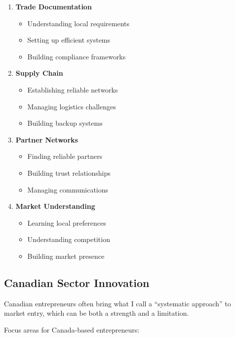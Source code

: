 \begin{enumerate}
    \item \textbf{Trade Documentation}
    \begin{itemize}
        \item Understanding local requirements
        \item Setting up efficient systems
        \item Building compliance frameworks
    \end{itemize}

    \item \textbf{Supply Chain}
    \begin{itemize}
        \item Establishing reliable networks
        \item Managing logistics challenges
        \item Building backup systems
    \end{itemize}

    \item \textbf{Partner Networks}
    \begin{itemize}
        \item Finding reliable partners
        \item Building trust relationships
        \item Managing communications
    \end{itemize}

    \item \textbf{Market Understanding}
    \begin{itemize}
        \item Learning local preferences
        \item Understanding competition
        \item Building market presence
    \end{itemize}
\end{enumerate}

\subsection{Canadian Sector Innovation}\label{subsec:canadian-sector-innovation-2}

Canadian entrepreneurs often bring what I call a ``systematic approach'' to market entry, which can be both a strength and a limitation.

Focus areas for Canada-based entrepreneurs:

